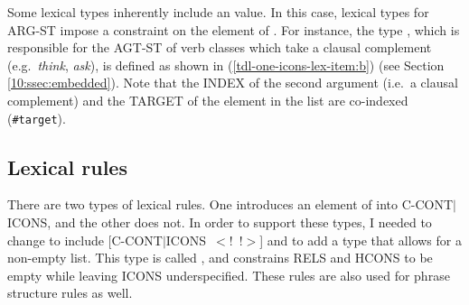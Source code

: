 \noindent Some lexical types inherently include an 
value. In this case, lexical types for ARG-ST
impose a constraint on the element of .  For instance,
the type , which is responsible
for the AGT-ST of verb classes which take a clausal complement
(e.g.\ \textit{think}, \textit{ask}), is defined as shown in
(\ref{tdl-one-icons-lex-item:b}) (see Section \ref{10:ssec:embedded}).  Note
that the INDEX of the second argument (i.e.\ a clausal complement) and
the TARGET of the element in the  list are co-indexed
(\texttt{\#target}).











\subsection{Lexical rules}
\label{11:ssec:lr}

There are two types of lexical rules. One introduces an element of
 into C-CONT{$\mid$}ICONS, and the
other does not.  In order to support these types, I needed to change
 to include \mbox{[C-CONT{$\mid$}ICONS
    \ensuremath{<}!  !\ensuremath{>}]} and to add a type that allows
for a non-empty  list. This type is called
, and constrains RELS and HCONS to be empty
while leaving ICONS underspecified. These rules
are also used for phrase structure rules as well.


